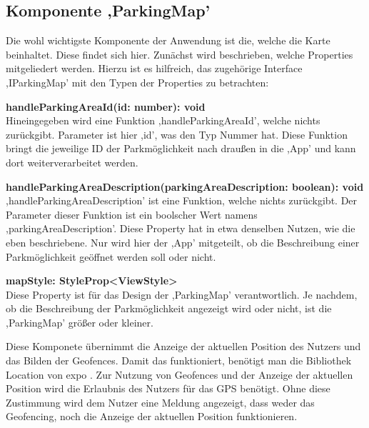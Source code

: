\subsection{Komponente ,ParkingMap'}
Die wohl wichtigste Komponente der Anwendung ist die, welche die Karte beinhaltet. Diese findet sich hier. Zunächst wird beschrieben, welche Properties mitgeliedert werden. Hierzu ist es hilfreich, das zugehörige Interface ,IParkingMap' mit den Typen der Properties zu betrachten:
\begin{description}
	\item \textbf{handleParkingAreaId(id: number): void} \\ Hineingegeben wird eine Funktion ,handleParkingAreaId', welche nichts zurückgibt. Parameter ist hier ,id', was den Typ Nummer hat. Diese Funktion bringt die jeweilige ID der Parkmöglichkeit nach draußen in die ,App' und kann dort weiterverarbeitet werden.
	\item \textbf{handleParkingAreaDescription(parkingAreaDescription: boolean): void} \\ ,handleParkingAreaDescription' ist eine Funktion, welche nichts zurückgibt. Der Parameter dieser Funktion ist ein boolscher Wert namens ,parkingAreaDescription'. Diese Property hat in etwa denselben Nutzen, wie die eben beschriebene. Nur wird hier der ,App' mitgeteilt, ob die Beschreibung einer Parkmöglichkeit geöffnet werden soll oder nicht.
	\item \textbf{mapStyle: StyleProp<ViewStyle>} \\ Diese Property ist für das Design der ,ParkingMap' verantwortlich. Je nachdem, ob die Beschreibung der Parkmöglichkeit angezeigt wird oder nicht, ist die ,ParkingMap' größer oder kleiner.
\end{description}

Diese Komponete übernimmt die Anzeige der aktuellen Position des Nutzers und das Bilden der Geofences. Damit das funktioniert, benötigt man die Bibliothek Location von expo \cite{expoLocation}. Zur Nutzung von Geofences und der Anzeige der aktuellen Position wird die Erlaubnis des Nutzers für das GPS benötigt. Ohne diese Zustimmung wird dem Nutzer eine Meldung angezeigt, dass weder das Geofencing, noch die Anzeige der aktuellen Position funktionieren.

